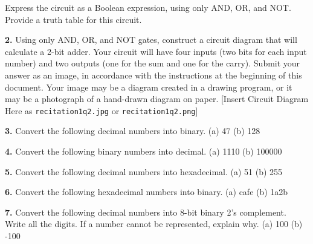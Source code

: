 \documentclass{article}
\begin{document}
Express the circuit as a Boolean expression, using only AND, OR, and NOT. Provide a truth table for this circuit.

\noindent\textbf{2.} Using only AND, OR, and NOT gates, construct a circuit diagram that will calculate a 2-bit adder. Your circuit will have four inputs (two bits for each input number) and two outputs (one for the sum and one for the carry). Submit your answer as an image, in accordance with the instructions at the beginning of this document. Your image may be a diagram created in a drawing program, or it may be a photograph of a hand-drawn diagram on paper. [Insert Circuit Diagram Here as \texttt{recitation1q2.jpg} or \texttt{recitation1q2.png}]

\noindent\textbf{3.} Convert the following decimal numbers into binary.
(a) 47
(b) 128

\noindent\textbf{4.} Convert the following binary numbers into decimal.
(a) 1110
(b) 100000

\noindent\textbf{5.} Convert the following decimal numbers into hexadecimal.
(a) 51
(b) 255

\noindent\textbf{6.} Convert the following hexadecimal numbers into binary.
(a) cafe
(b) 1a2b

\noindent\textbf{7.} Convert the following decimal numbers into 8-bit binary 2’s complement. Write all the digits.  If a number cannot be represented, explain why.
(a) 100
(b) -100
\end{document}
